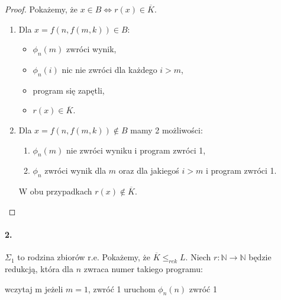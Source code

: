 \documentclass{article}
\newcommand{\N}{\mathbb{N}}
\newcommand{\reduces}{\le_\mathit{rek}}
\renewcommand{\complement}{\overline}
\begin{document}
\begin{proof}
    Pokażemy, że $x \in B \iff r(x) \in \complement{K}$.
    
    \begin{enumerate}
        \item Dla $x = f(n, f(m, k)) \in B$:
            \begin{itemize}
                \item $\phi_n(m)$ zwróci wynik,
                \item $\phi_n(i)$ nic nie zwróci dla każdego $i > m$,
                \item program się zapętli,
                \item $r(x) \in \complement{K}$.
            \end{itemize}
        \item Dla $x = f(n, f(m, k)) \notin B$ mamy 2 możliwości:
            \begin{enumerate}
                \item $\phi_n(m)$ nie zwróci wyniku i program zwróci 1,
                \item $\phi_n$ zwróci wynik dla $m$
                    oraz dla jakiegoś $i > m$ i program zwróci 1.
            \end{enumerate}
            
            W obu przypadkach $r(x) \notin \complement{K}$.
    \end{enumerate}
\end{proof}

\paragraph{2.}
$\Sigma_1$ to rodzina zbiorów r.e.
Pokażemy, że $\complement{K} \reduces L$.
Niech $r \colon \N \to \N$ będzie redukcją,
która dla $n$ zwraca numer takiego programu:

\begin{algorithm}[H]
    \begin{algorithmic}[1]
        \STATE wczytaj m
        \STATE jeżeli $m = 1$, zwróć 1
        \STATE uruchom $\phi_n(n)$
        \STATE zwróć 1
    \end{algorithmic}
\end{algorithm}
\end{document}
